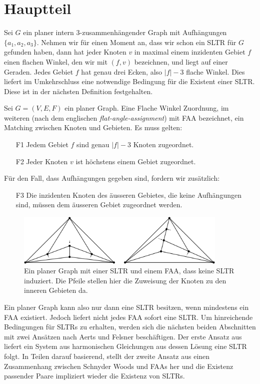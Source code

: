 \chapter{Hauptteil}

Sei $G$ ein planer intern 3-zusammenhängender Graph mit Aufhängungen $\{a_1,a_2,a_3\}$. Nehmen wir für einen Moment an, dass wir schon ein SLTR für $G$ gefunden haben, dann hat jeder Knoten $v$ in maximal einem inzidenten Gebiet $f$ einen flachen Winkel, den wir mit $(f,v)$ bezeichnen, und liegt auf einer Geraden. Jedes Gebiet $f$ hat genau drei Ecken, also $|f|-3$ flache Winkel. Dies liefert im Umkehrschluss eine notwendige Bedingung für die Existent einer SLTR. Diese ist in der nächsten Definition festgehalten.

\begin{definition}[FAA]\label{def_faa}
Sei $G=(V,E,F)$ ein planer Graph. Eine Flache Winkel Zuordnung, im weiteren (nach dem englischen \textit{flat-angle-assignment}) mit FAA bezeichnet, ein Matching zwischen Knoten und Gebieten. Es muss gelten:
\begin{itemize}
\item [F1] Jedem Gebiet $f$ sind genau $|f|-3$ Knoten zugeordnet.
\item [F2] Jeder Knoten $v$ ist höchstens einem Gebiet zugeordnet.
\end{itemize}
Für den Fall, dass Aufhängungen gegeben sind, fordern wir zusätzlich:
\begin{itemize}
\item [F3] Die inzidenten Knoten des äusseren Gebietes, die keine Aufhängungen sind, müssen dem äusseren Gebiet zugeordnet werden.
\end{itemize}

\begin{figure}[h]
	\centering
  \includegraphics[width=0.9\textwidth]{faa_def.png}
  \caption{Ein planer Graph mit einer SLTR und einem FAA, dass keine SLTR induziert. Die Pfeile stellen hier die Zuweisung der Knoten zu den inneren Gebieten da.}
\end{figure}

\end{definition}

Ein planer Graph kann also nur dann eine SLTR besitzen, wenn mindestens ein FAA existiert. Jedoch liefert nicht jedes FAA sofort eine SLTR. Um hinreichende Bedingungen für SLTRs zu erhalten, werden sich die nächsten beiden Abschnitten mit zwei Ansätzen nach Aerts und Felsner beschäftigen. Der erste Ansatz aus \cite{af13} liefert ein System aus harmonischen Gleichungen aus dessen Lösung eine SLTR folgt. In Teilen darauf basierend, stellt der zweite Ansatz aus \cite{af15} einen Zusammenhang zwischen Schnyder Woods und FAAs her und die Existenz passender Paare impliziert wieder die Existenz von SLTRs.



